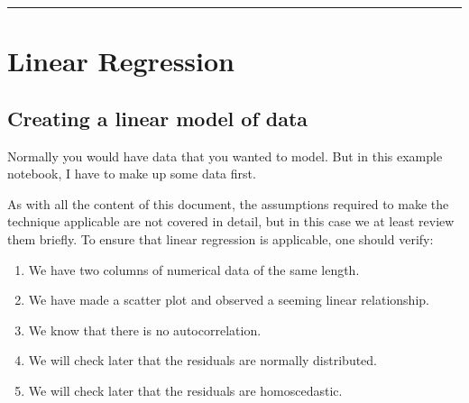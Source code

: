 \documentclass[letterpaper,10pt,english]{sphinxmanual}
\begin{document}
\bigskip\hrule\bigskip



\section{Linear Regression}
\label{\detokenize{GB213-review-in-Python:linear-regression}}

\subsection{Creating a linear model of data}
\label{\detokenize{GB213-review-in-Python:creating-a-linear-model-of-data}}
Normally you would have data that you wanted to model.  But in this example notebook, I have to make up some data first.

\begin{sphinxVerbatim}[commandchars=\\\{\}]
   
      \PYG{p}{[}        \PYG{p}{]}  
       \PYG{p}{[}               \PYG{p}{]}   
 
\end{sphinxVerbatim}

As with all the content of this document, the assumptions required to make the technique applicable are not covered in detail, but in this case we at least review them briefly.  To ensure that linear regression is applicable, one should verify:
\begin{enumerate}
%
\item {} 
We have two columns of numerical data of the same length.

\item {} 
We have made a scatter plot and observed a seeming linear relationship.

\item {} 
We know that there is no autocorrelation.

\item {} 
We will check later that the residuals are normally distributed.

\item {} 
We will check later that the residuals are homoscedastic.

\end{enumerate}
\end{document}
